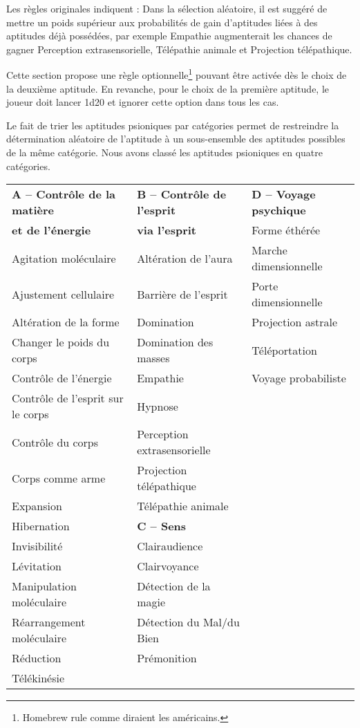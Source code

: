 Les règles originales indiquent : \og Dans la sélection aléatoire, il est suggéré de mettre un poids supérieur aux probabilités de gain d’aptitudes liées à des aptitudes déjà possédées, par exemple Empathie augmenterait les chances de gagner Perception extrasensorielle, Télépathie animale et Projection télépathique\fg{}.

\bigskip

Cette section propose une règle optionnelle\footnote{\og Homebrew rule \fg{} comme diraient les américains.} pouvant être activée dès le choix de la deuxième aptitude. En revanche, pour le choix de la première aptitude, le joueur doit lancer 1d20 et ignorer cette option dans tous les cas.

\bigskip

Le fait de trier les aptitudes psioniques par catégories permet de restreindre la détermination aléatoire de l'aptitude à un sous-ensemble des aptitudes possibles de la même catégorie. Nous avons classé les aptitudes psioniques en quatre catégories.

\bigskip

\begin{tabular}{p{5.5cm}p{5.5cm}p{5.5cm}}
\textbf{A -- Contrôle de la matière} & \textbf{B -- Contrôle de l'esprit}   & \textbf{D -- Voyage psychique} \\
\textbf{et de l'énergie}             & \textbf{via l'esprit}                & Forme éthérée \\
Agitation moléculaire                & Altération de l'aura                 & Marche dimensionnelle \\
Ajustement cellulaire               & Barrière de l'esprit                 & Porte dimensionnelle \\
Altération de la forme              & Domination                           & Projection astrale \\
Changer le poids du corps           & Domination des masses                & Téléportation \\
Contrôle de l'énergie               & Empathie                             &  Voyage probabiliste\\
Contrôle de l'esprit sur le corps   & Hypnose & \\
Contrôle du corps                   & Perception extrasensorielle & \\
Corps comme arme                    & Projection télépathique &\\
Expansion                           & Télépathie animale &\\
Hibernation                         & \textbf{C -- Sens} & \\
Invisibilité                        & Clairaudience & \\
Lévitation                          & Clairvoyance & \\
Manipulation moléculaire            & Détection de la magie & \\
Réarrangement moléculaire           & Détection du Mal/du Bien & \\
Réduction                           & Prémonition & \\
Télékinésie                && \\
\end{tabular}

